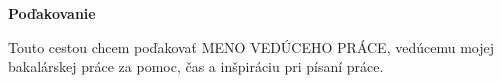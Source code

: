 \null
\vfill

\textbf{Poďakovanie}

Touto cestou chcem poďakovať MENO VEDÚCEHO PRÁCE, vedúcemu mojej bakalárskej práce za pomoc, čas a inšpiráciu pri písaní práce.

\thispagestyle{empty}